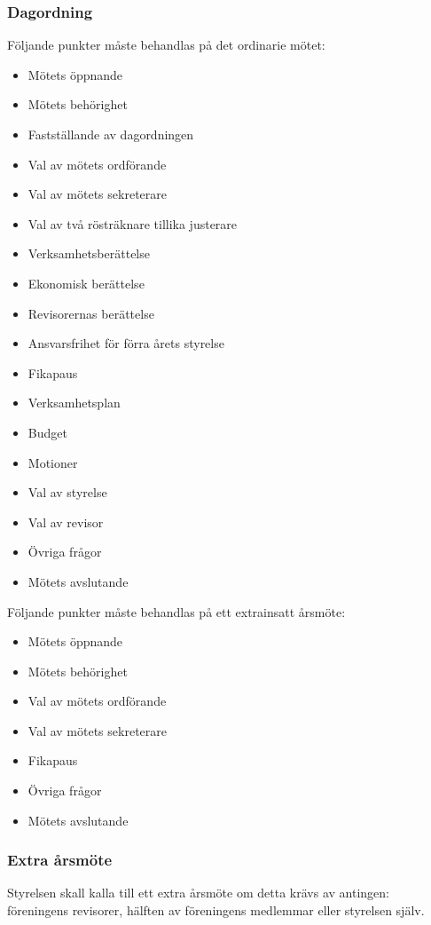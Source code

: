 \documentclass[11pt, noincludeaddress]{classes/cthit}
\begin{document}
\subsubsection{Dagordning}
Följande punkter måste behandlas på det ordinarie mötet: 

\begin{itemize}
    \item Mötets öppnande 
    \item Mötets behörighet 
    \item Fastställande av dagordningen 
    \item Val av mötets ordförande 
    \item Val av mötets sekreterare 
    \item Val av två rösträknare tillika justerare 
    \item Verksamhetsberättelse 
    \item Ekonomisk berättelse 
    \item Revisorernas berättelse 
    \item Ansvarsfrihet för förra årets styrelse 
    \item Fikapaus 
    \item Verksamhetsplan 
    \item Budget 
    \item Motioner 
    \item Val av styrelse 
    \item Val av revisor 
    \item Övriga frågor
    \item Mötets avslutande 
\end{itemize}

Följande punkter måste behandlas på ett extrainsatt årsmöte: 
\begin{itemize}
    \item Mötets öppnande 
    \item Mötets behörighet 
    \item Val av mötets ordförande 
    \item Val av mötets sekreterare 
    \item Fikapaus 
    \item Övriga frågor 
    \item Mötets avslutande 
\end{itemize}

\subsubsection{Extra årsmöte}
Styrelsen skall kalla till ett extra årsmöte om detta krävs av antingen: föreningens revisorer, hälften av föreningens medlemmar eller styrelsen själv. 
\end{document}
